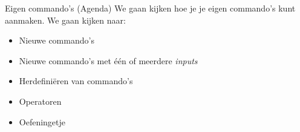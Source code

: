 \begin{frame}[fragile]{Eigen commando's (Agenda)}
We gaan kijken hoe je je eigen commando's kunt aanmaken. 
We gaan kijken naar:
\begin{itemize}[label=\textbullet]
    \pause 
    \item Nieuwe commando's 
    \pause
    \item Nieuwe commando's met één of meerdere \emph{inputs} 
    \pause
    \item Herdefiniëren van commando's 
    \pause
    \item Operatoren 
    \pause
    \item Oefeningetje 
\end{itemize}
\end{frame}